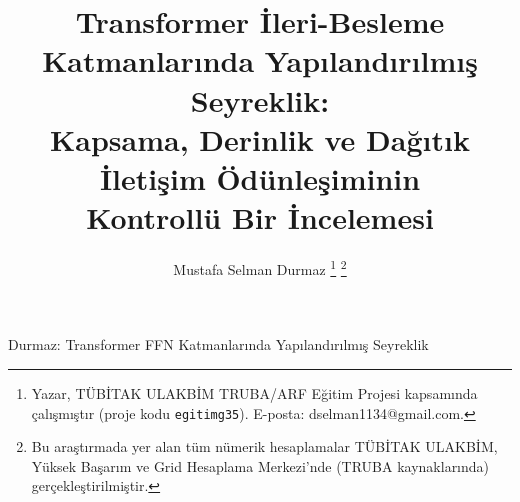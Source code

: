 \documentclass[10pt,journal]{IEEEtran}
\begin{document}
\title{Transformer İleri-Besleme Katmanlarında Yapılandırılmış Seyreklik:\\
Kapsama, Derinlik ve Dağıtık İletişim Ödünleşiminin\\ Kontrollü Bir İncelemesi}

\author{Mustafa Selman Durmaz%
\thanks{Yazar, TÜBİTAK ULAKBİM TRUBA/ARF Eğitim Projesi kapsamında çalışmıştır
(proje kodu \texttt{egitimg35}). E-posta: dselman1134@gmail.com.}%
\thanks{Bu araştırmada yer alan tüm nümerik hesaplamalar TÜBİTAK ULAKBİM, Yüksek
Başarım ve Grid Hesaplama Merkezi'nde (TRUBA kaynaklarında) gerçekleştirilmiştir.}}

%
{Durmaz: Transformer FFN Katmanlarında Yapılandırılmış Seyreklik}

\maketitle
\end{document}
